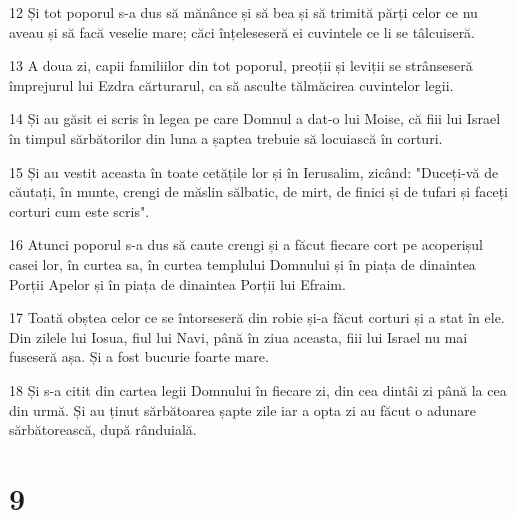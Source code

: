 \par 12 Și tot poporul s-a dus să mănânce și să bea și să trimită părți celor ce nu aveau și să facă veselie mare; căci înțeleseseră ei cuvintele ce li se tâlcuiseră.
\par 13 A doua zi, capii familiilor din tot poporul, preoții și leviții se strânseseră împrejurul lui Ezdra cărturarul, ca să asculte tălmăcirea cuvintelor legii.
\par 14 Și au găsit ei scris în legea pe care Domnul a dat-o lui Moise, că fiii lui Israel în timpul sărbătorilor din luna a șaptea trebuie să locuiască în corturi.
\par 15 Și au vestit aceasta în toate cetățile lor și în Ierusalim, zicând: "Duceți-vă de căutați, în munte, crengi de măslin sălbatic, de mirt, de finici și de tufari și faceți corturi cum este scris".
\par 16 Atunci poporul s-a dus să caute crengi și a făcut fiecare cort pe acoperișul casei lor, în curtea sa, în curtea templului Domnului și în piața de dinaintea Porții Apelor și în piața de dinaintea Porții lui Efraim.
\par 17 Toată obștea celor ce se întorseseră din robie și-a făcut corturi și a stat în ele. Din zilele lui Iosua, fiul lui Navi, până în ziua aceasta, fiii lui Israel nu mai fuseseră așa. Și a fost bucurie foarte mare.
\par 18 Și s-a citit din cartea legii Domnului în fiecare zi, din cea dintâi zi până la cea din urmă. Și au ținut sărbătoarea șapte zile iar a opta zi au făcut o adunare sărbătorească, după rânduială.

\chapter{9}

